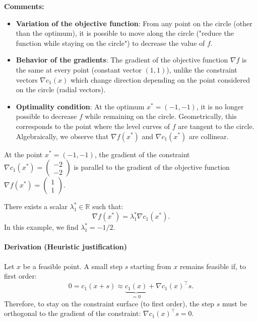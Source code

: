 \begin{figureexplanation}
\textbf{Comments:}
\begin{itemize}
    \item \textbf{Variation of the objective function}: From any point on the circle (other than the optimum), it is possible to move along the circle ("reduce the function while staying on the circle") to decrease the value of $f$.
    \item \textbf{Behavior of the gradients}: The gradient of the objective function $\nabla f$ is the same at every point (constant vector $(1,1)$), unlike the constraint vectors $\nabla c_1(x)$ which change direction depending on the point considered on the circle (radial vectors).
    \item \textbf{Optimality condition}: At the optimum $x^*=(-1,-1)$, it is no longer possible to decrease $f$ while remaining on the circle. Geometrically, this corresponds to the point where the level curves of $f$ are tangent to the circle. Algebraically, we observe that $\nabla f(x^*)$ and $\nabla c_1(x^*)$ are collinear.
\end{itemize}
\end{figureexplanation}

\begin{remarque}
At the point $x^* = (-1, -1)$, the gradient of the constraint $\nabla c_1(x^*) = \begin{pmatrix} -2 \\ -2 \end{pmatrix}$ is parallel to the gradient of the objective function $\nabla f(x^*) = \begin{pmatrix} 1 \\ 1 \end{pmatrix}$.

There exists a scalar $\lambda_1^* \in \mathbb{R}$ such that:
\begin{equation}
    \nabla f(x^*) = \lambda_1^* \nabla c_1(x^*).
\end{equation}
In this example, we find $\lambda_1^* = -1/2$.
\end{remarque}

\paragraph{Derivation (Heuristic justification)}
Let $x$ be a feasible point. A small step $s$ starting from $x$ remains feasible if, to first order:
\begin{equation}
    0 = c_1(x+s) \approx \underbrace{c_1(x)}_{=0} + \nabla c_1(x)^\top s.
\end{equation}
Therefore, to stay on the constraint surface (to first order), the step $s$ must be orthogonal to the gradient of the constraint: $\nabla c_1(x)^\top s = 0$.

